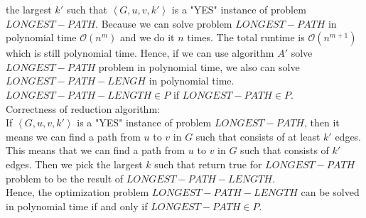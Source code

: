 \documentclass[12pt,letterpaper]{article}
\begin{document}
the largest $k'$ such that $ \left \langle G,u,v,k' \right \rangle $ is a "YES" instance of problem $LONGEST-PATH$. Because we can
solve problem $LONGEST-PATH$ in polynomial time $\mathcal{O}(n^m)$ and we do it $n$ times. The total runtime is $\mathcal{O}(n^{m+1})$ which is still
polynomial time. Hence, if we can use algorithm $A'$ solve $LONGEST-PATH$ problem in polynomial time, we also can solve $LONGEST-PATH-LENGH$ in polynomial time.
$LONGEST-PATH-LENGTH \in P$ if $LONGEST-PATH \in P$. \\
Correctness of reduction algorithm: \\
If $ \left \langle G,u,v,k' \right \rangle $ is a "YES" instance of problem $LONGEST-PATH$, then it means we can find a path from $u$ to $v$ in $G$ such that
consists of at least $k'$ edges. This means that we can find a path from $u$ to $v$ in $G$ such that consists of $k'$ edges.
Then we pick the largest $k$ such that return true for $LONGEST-PATH$ problem to be the result of $LONGEST-PATH-LENGTH$.  \\
Hence, the optimization problem $LONGEST-PATH-LENGTH$ can be solved in polynomial time if and only if $LONGEST-PATH \in P$.
\end{document}
